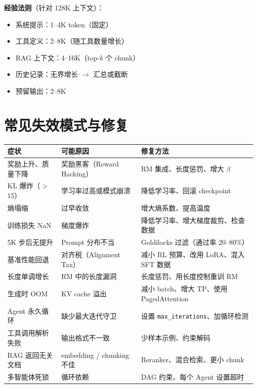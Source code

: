 \textbf{经验法则}（针对 128K 上下文）：

\begin{itemize}
  \item 系统提示：1--4K token（固定）
  \item 工具定义：2--8K（随工具数量增长）
  \item RAG 上下文：4--16K（top-$k$ 个 chunk）
  \item 历史记录：无界增长 $\rightarrow$ 汇总或截断
  \item 预留输出：2--8K
\end{itemize}

\section{常见失效模式与修复}
\label{common-failure-modes-fixes}

\noindent\begin{tabularx}{\linewidth}{@{}Z{0.64} Z{0.9} Z{1.46}@{}}
\toprule
\textbf{症状} & \textbf{可能原因} & \textbf{修复方法} \\
\midrule
奖励上升、质量下降 & 奖励黑客（Reward Hacking） & RM 集成、长度惩罚、增大 $\beta$ \\
KL 爆炸（$>$15） & 学习率过高或模式崩溃 & 降低学习率、回滚 checkpoint \\
熵塌缩 & 过早收敛 & 增大熵系数、提高温度 \\
训练损失 NaN & 梯度爆炸 & 降低学习率、增大梯度裁剪、检查数据 \\
5K 步后无提升 & Prompt 分布不当 & Goldilocks 过滤（通过率 20--80\%） \\
基准性能回退 & 对齐税（Alignment Tax） & 减小 RL 预算、改用 LoRA、混入 SFT 数据 \\
长度单调增长 & RM 中的长度漏洞 & 长度惩罚、用长度控制重训 RM \\
生成时 OOM & KV cache 溢出 & 减小 batch、增大 TP、使用 PagedAttention \\
Agent 永久循环 & 缺少最大迭代守卫 & 设置 \texttt{max\_iterations}、加循环检测 \\
工具调用解析失败 & 输出格式不一致 & 少样本示例、约束解码 \\
RAG 返回无关文档 & embedding / chunking 不佳 & Reranker、混合检索、更小 chunk \\
多智能体死锁 & 循环依赖 & DAG 约束、每个 Agent 设置超时 \\
\bottomrule
\end{tabularx}

